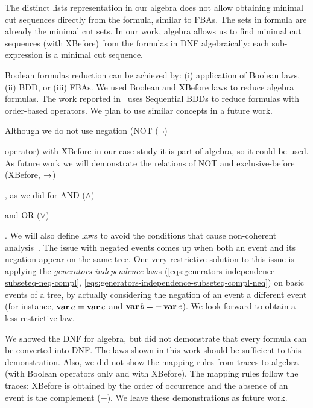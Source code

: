 \documentclass[en,twoside,onehalfspacing,phd]{risethesis}
\def\ortext{OR ($\lor$)%
  \gdef\ortext{OR\xspace}%
  \xspace
}
\def\andtext{AND ($\land$)%
  \gdef\andtext{AND\xspace}%
  \xspace
}
\def\nottext{NOT ($\lnot$)%
  \gdef\nottext{NOT\xspace}%
  \xspace
}
\def\xbeforetext{exclusive-before (XBefore, $\xbefore$)%
  \gdef\xbeforetext{XBefore\xspace}%
  \xspace
}
\def\varop{\ensuremath\operatorname{\mathbf{var}}}
\newcommand{\var}[1]{\ensuremath\varop #1}
\def\xbeforeop{\ensuremath\rightarrow}
\newcommand{\xbefore}[2]{\ensuremath #1 \xbeforeop #2 }
\def\xbefore{\ensuremath\operatorname{\rightarrow}}
\begin{document}
The distinct lists representation in our algebra does not allow obtaining minimal cut sequences directly from the formula, similar to \acp{FBA}.
The sets in  formula are already the minimal cut sets.
In our work, \ac{algebra} allows us to find minimal cut sequences (with XBefore) from the formulas in DNF algebraically: each sub-expression is a minimal cut sequence.

Boolean formulas reduction can be achieved by: (i) application of Boolean laws, (ii) \ac{BDD}, or (iii) \acp{FBA}.
We used Boolean and XBefore laws to reduce \ac{algebra} formulas.
%
The work reported in~\cite{TXD2011,XTD2012} uses Sequential BDDs to reduce formulas with order-based operators.
%
We plan to use similar concepts in a future work.

Although we do not use negation (\nottext operator) with XBefore in our case study it is part of \ac{algebra}, so it could be used.
As future work we will demonstrate the relations of \nottext and \xbeforetext, as we did for \andtext and \ortext.
We will also define laws to avoid the conditions that cause non-coherent analysis~\cite{Oliv2006}.
The issue with negated events comes up when both an event and its negation appear on the same tree.
One very restrictive solution to this issue is applying the \emph{generators independence} laws (\ref{eqs:generators-independence-subseteq-neq-compl}, \ref{eqs:generators-independence-subseteq-compl-neq}) on basic events of a tree, by actually considering the negation of an event a different event (for instance, $\var a= \var e$ and $\var b=-\var e$).
We look forward to obtain a less restrictive law.


We showed the DNF for \ac{algebra}, but did not demonstrate that every formula can be converted into DNF.
The laws shown in this work should be sufficient to this demonstration.
Also, we did not show the mapping rules from traces to \ac{algebra} (with Boolean operators only and with XBefore).
The mapping rules follow the traces: XBefore is obtained by the order of occurrence and the absence of an event is the complement ($-$).
We leave these demonstrations as future work.
\end{document}
